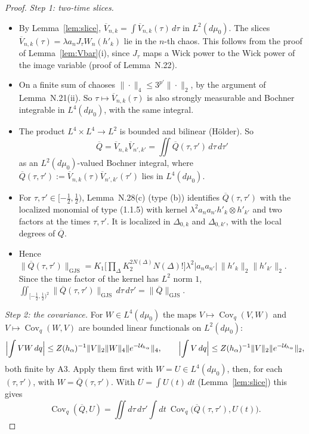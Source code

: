 \documentclass[11pt,a4paper]{article}
\DeclareMathOperator{\Cov}{Cov}
\newcommand{\GJS}[1]{\lVert #1\rVert_{\mathrm{GJS}}}
\newcommand{\Uc}{\mathcal U}
\newcommand{\dmu}{d\mu_0}
\newcommand{\Vb}{\overline V}                 %
\theoremstyle{plain}
\theoremstyle{definition}
\begin{document}
\begin{proof}
\emph{Step 1: two-time slices.}
\begin{itemize}
\item By Lemma~\ref{lem:slice}, $\Vb_{n,k}=\int\Vb_{n,k}(\tau)\,d\tau$ in $L^2(\dmu)$.  The slices
$\Vb_{n,k}(\tau)=\lambda a_nJ_\tau W_n(h'_k)$ lie in the $n$-th chaos.  This follows from the
proof of Lemma~\ref{lem:Vbar}(i), since $J_\tau$ maps a Wick power to the Wick power of the image
variable (proof of Lemma~N.22).
\item On a finite sum of chaoses $\|\cdot\|_4\le3^{p'}\|\cdot\|_2$, by the argument of
Lemma~N.21(ii).  So $\tau\mapsto\Vb_{n,k}(\tau)$ is also strongly measurable and Bochner
integrable in $L^4(\dmu)$, with the same integral.
\item The product $L^4\times L^4\to L^2$ is bounded and bilinear (H\"older).  So
\[
 \overline Q=\Vb_{n,k}\Vb_{n',k'}=\iint\overline Q(\tau,\tau')\,d\tau\,d\tau'
\]
as an $L^2(\dmu)$-valued Bochner integral, where
$\overline Q(\tau,\tau'):=\Vb_{n,k}(\tau)\Vb_{n',k'}(\tau')$ lies in $L^4(\dmu)$.
\item For $\tau,\tau'\in[-\frac12,\frac12)$, Lemma~N.28(c) (type (b)) identifies
$\overline Q(\tau,\tau')$ with the localized monomial of type (1.1.5) with kernel
$\lambda^2a_na_{n'}h'_k\otimes h'_{k'}$ and two factors at the times $\tau,\tau'$.  It is localized
in $\Delta_{0,k}$ and $\Delta_{0,k'}$, with the local degrees of $\overline Q$.
\item Hence
$\GJS{\overline Q(\tau,\tau')}=K_1\bigl[\prod_\Delta K_2^{2N(\Delta)}N(\Delta)!\bigr]
\lambda^2|a_na_{n'}|\,\|h'_k\|_2\|h'_{k'}\|_2$.  Since the time factor of the kernel has $L^2$ norm
$1$, $\iint_{[-\frac12,\frac12)^2}\GJS{\overline Q(\tau,\tau')}\,d\tau\,d\tau'=\GJS{\overline Q}$.
\end{itemize}

\emph{Step 2: the covariance.}  For $W\in L^4(\dmu)$ the maps $V\mapsto\Cov_q(V,W)$ and
$V\mapsto\Cov_q(W,V)$ are bounded linear functionals on $L^2(\dmu)$:
\[
 \Bigl|\int VW\,dq\Bigr|\le Z(h_\alpha)^{-1}\|V\|_2\|W\|_4\|e^{-\Uc_{h_\alpha}}\|_4,\qquad
 \Bigl|\int V\,dq\Bigr|\le Z(h_\alpha)^{-1}\|V\|_2\|e^{-\Uc_{h_\alpha}}\|_2 ,
\]
both finite by A3.  Apply them first with $W=U\in L^4(\dmu)$, then, for each $(\tau,\tau')$,
with $W=\overline Q(\tau,\tau')$.  With $U=\int U(t)\,dt$ (Lemma~\ref{lem:slice}) this gives
\[
 \Cov_q(\overline Q,U)=\iint d\tau\,d\tau'\int dt\ \Cov_q\bigl(\overline Q(\tau,\tau'),U(t)\bigr).
\]


\end{proof}
\end{document}
